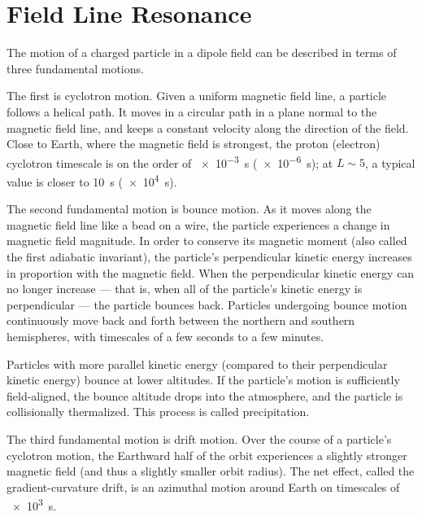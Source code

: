 


\chapter{Field Line Resonance}
  \label{ch_flrs}



The motion of a charged particle in a dipole field can be described in terms
of three fundamental motions. 

The first is cyclotron motion. Given a uniform magnetic field line, a particle
follows a helical path. It moves in a circular path in a plane normal to the
magnetic field line, and keeps a constant velocity along the direction of the
field. Close to Earth, where the magnetic field is strongest, the proton
(electron) cyclotron timescale is on the order of \SI{e-3}{\s} (\SI{e-6}{\s});
at $L \sim 5$, a typical value is closer to \SI{10}{\s} (\SI{e4}{\s}). 

The second fundamental motion is bounce motion. As it moves along the magnetic
field line like a bead on a wire, the particle experiences a change in magnetic
field magnitude. In order to conserve its magnetic moment (also called the
first adiabatic invariant), the particle's perpendicular kinetic energy
increases in proportion with the magnetic field. When the perpendicular kinetic
energy can no longer increase --- that is, when all of the particle's kinetic
energy is perpendicular --- the particle bounces back. Particles undergoing
bounce motion continuously move back and forth between the northern and
southern hemispheres, with timescales of a few seconds to a few minutes. 

Particles with more parallel kinetic energy (compared to their perpendicular
kinetic energy) bounce at lower altitudes. If the particle's motion is
sufficiently field-aligned, the bounce altitude drops into the atmosphere, and
the particle is collisionally thermalized. This process is called
precipitation.

The third fundamental motion is drift motion. Over the course of a particle's
cyclotron motion, the Earthward half of the orbit experiences a slightly
stronger magnetic field (and thus a slightly smaller orbit radius). The net
effect, called the gradient-curvature drift, is an azimuthal motion around
Earth on timescales of \about\SI{e3}{\s}. 

